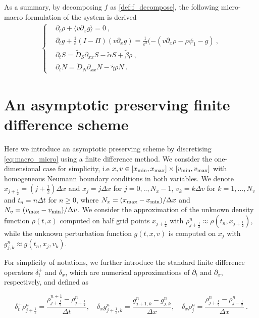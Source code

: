 \documentclass[11pt,twoside]{article}
\theoremstyle{nonumberplain}
\begin{document}
As a summary, by decomposing $f$ as \eqref{def:f_decompose}, the following micro-macro formulation of the system is derived
\begin{align}\label{eq:macro_micro}
\begin{cases}
	&\partial_t \rho +  \langle v\partial_x g\rangle  = 0\ , \\
	&\partial_t g + \frac{1}{\varepsilon} (I-\Pi) ({v}\partial_x g) = \frac{1}{\varepsilon^2}(-({v}\partial_x \rho-\rho\psi_1 -  g) \ ,\\
	&  \partial_t S = \tilde{D}_S\partial_{xx} S -\tilde{\alpha}S+\tilde{\beta}\rho\ ,\\
 & \partial_tN = \tilde{D}_N\partial_{xx} N-\tilde{\gamma}\rho N\ .
\end{cases}
\end{align}

\section{An asymptotic preserving finite difference scheme}

Here we introduce an asymptotic preserving scheme by discretising \eqref{eq:macro_micro} using a finite difference method. 
We consider the one-dimensional case for simplicity, i.e $x,v\in[x_{\textnormal{min}},x_{\textnormal{max}}]\times[v_{\textnormal{min}},v_{\textnormal{max}}]$ with homogeneous Neumann boundary conditions in both variables.
We denote  $x_{j+\frac{1}{2}}=(j+\frac{1}{2})\Delta x$ and $x_{j}=j\Delta x$ for $j=0,..,N_x-1$,  $v_k=k\Delta v$ for $ k=1,...,N_v$ and $t_n=n\Delta t$ for $n\geq 0$, where $ N_x=(x_{\textnormal{max}}-x_{\textnormal{min}})/\Delta x$ and $N_v=(v_{\textnormal{max}}-v_{\textnormal{min}})/\Delta v$. We consider the approximation of the unknown density function  $\rho(t,x)$ computed on half grid points $x_{j+\frac{1}{2}}$ with $\rho_{j+\frac{1}{2}}^n\approx\rho(t_n,x_{j+\frac{1}{2}})$, while the unknown perturbation function $g(t,x,v)$ is computed on  $x_{j}$ with $g_{j,k}^n\approx g(t_n,x_{j},v_k)$. %

For simplicity of notations, we further introduce the standard finite difference operators $\delta_t^+$ and $\delta_x$, which are numerical approximations of $\partial_t$ and $\partial_x$, respectively, and defined as 

$$\delta_t^+\rho_{j+\frac{1}{2}}^n=\frac{\rho_{j+\frac{1}{2}}^{n+1}-\rho_{j+\frac{1}{2}}^n}{\Delta t}, \quad\delta_xg_{j+\frac{1}{2},k}^n=\frac{g_{j+1,k}^n-g_{j,k}^n}{\Delta x},\quad \delta_x\rho_{j}^n=\frac{\rho_{j+\frac12}^n-\rho_{j-\frac12}^n}{\Delta x}\ .$$
\end{document}

